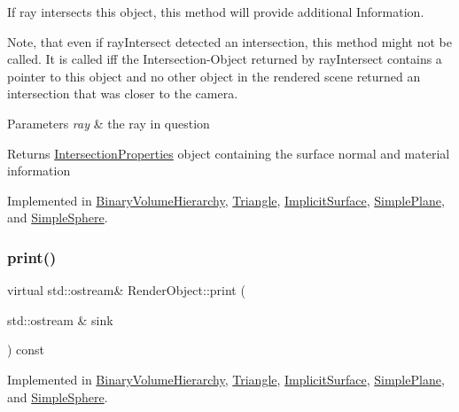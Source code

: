 If ray intersects this object, this method will provide additional Information. 

Note, that even if ray\+Intersect detected an intersection, this method might not be called. It is called iff the Intersection-\/\+Object returned by ray\+Intersect contains a pointer to this object and no other object in the rendered scene returned an intersection that was closer to the camera.


\begin{DoxyParams}{Parameters}
{\em ray} & the ray in question \\
\hline
\end{DoxyParams}
\begin{DoxyReturn}{Returns}
\mbox{\hyperlink{classIntersectionProperties}{Intersection\+Properties}} object containing the surface normal and material information 
\end{DoxyReturn}


Implemented in \mbox{\hyperlink{classBinaryVolumeHierarchy_a91c6b8be167dd13ddbb874d4b9f0cedb}{Binary\+Volume\+Hierarchy}}, \mbox{\hyperlink{classTriangle_abbca4150897005e47c87758833479c87}{Triangle}}, \mbox{\hyperlink{classImplicitSurface_a13aa500c7dbcd75e77b43fba741b1ec8}{Implicit\+Surface}}, \mbox{\hyperlink{classSimplePlane_a29180f657d6932226dc91ebe92143608}{Simple\+Plane}}, and \mbox{\hyperlink{classSimpleSphere_a4c71f3e8197f40c18cee7508f2fd3e9c}{Simple\+Sphere}}.

\mbox{\label{classRenderObject_a7a7f1168a7d96ca95235b170ff7fb11b}} 
\subsubsection{\texorpdfstring{print()}{print()}}
{\footnotesize\ttfamily virtual std\+::ostream\& Render\+Object\+::print (\begin{DoxyParamCaption}\item[{std\+::ostream \&}]{sink }\end{DoxyParamCaption}) const\hspace{0.3cm}{\ttfamily [pure virtual]}}



Implemented in \mbox{\hyperlink{classBinaryVolumeHierarchy_ad92d27372aef59591ddc239685ca770d}{Binary\+Volume\+Hierarchy}}, \mbox{\hyperlink{classTriangle_af5089786289dbeb3a5f41affb4edb569}{Triangle}}, \mbox{\hyperlink{classImplicitSurface_a2267c88829c97c12ff8f7d250ce94802}{Implicit\+Surface}}, \mbox{\hyperlink{classSimplePlane_afc8014126bb264e11e7b2b470a8a90a1}{Simple\+Plane}}, and \mbox{\hyperlink{classSimpleSphere_a2da3c9e41a8d8e6ec4012343ea0fa793}{Simple\+Sphere}}.

